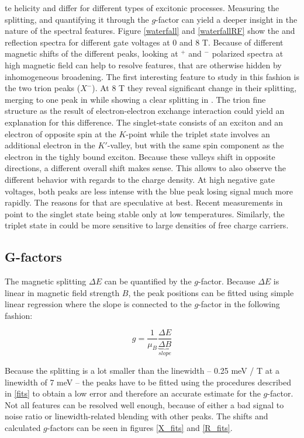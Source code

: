te helicity and differ for different types of excitonic processes. Measuring the splitting, and quantifying it through the $g$-factor can yield a deeper insight in the nature of the spectral features. Figure \ref{waterfall} and \ref{waterfallRF} show the \pl and reflection spectra for different gate voltages at 0 and 8 T. Because of different magnetic shifts of the different peaks, looking at \sigma$^+$ and \sigma$^-$ polarized spectra at high magnetic field can help to resolve features, that are otherwise hidden by inhomogeneous broadening. The first interesting feature to study in this fashion is the two trion peaks ($X^-$). At 8 T they reveal significant change in their splitting, merging to one peak in \sigp while showing a clear splitting in \sigm. The trion fine structure as the result of electron-electron exchange interaction could yield an explanation for this difference. The singlet-state consists of an exciton and an electron of opposite spin at the $K$-point while the triplet state involves an additional electron in the $K'$-valley, but with the same spin component as the electron in the tighly bound exciton. Because these valleys shift in opposite directions, a different overall shift makes sense. This allows to also observe the different behavior with regards to the charge density. At high negative gate voltages, both peaks are less intense with the blue peak losing signal much more rapidly. The reasons for that are speculative at best. Recent measurements in \ws point to the singlet state being stable only at low temperatures\cite{vaclavkova_singlet_2018}. Similarly, the triplet state in \wse could be more sensitive to large densities of free charge carriers. 

\subsection{G-factors}

The magnetic splitting $\Delta E$ can be quantified by the $g$-factor. Because $\Delta E$ is linear in magnetic field strength $B$, the peak positions can be fitted using simple linear regression where the slope is connected to the $g$-factor in the following fashion:

\[ g =  \frac{1}{\mu_B}\underbrace{\frac{\Delta E}{\Delta B}}_{slope} \]

Because the splitting is a lot smaller than the linewidth -- 0.25 meV / T at a linewidth of 7 meV -- the peaks have to be fitted using the procedures described in \ref{fits} to obtain a low error and therefore an accurate estimate for the $g$-factor. Not all features can be resolved well enough, because of either a bad signal to noise ratio or linewidth-related blending with other peaks. The shifts and calculated $g$-factors can be seen in figures \ref{X_fits} and \ref{R_fits}.

